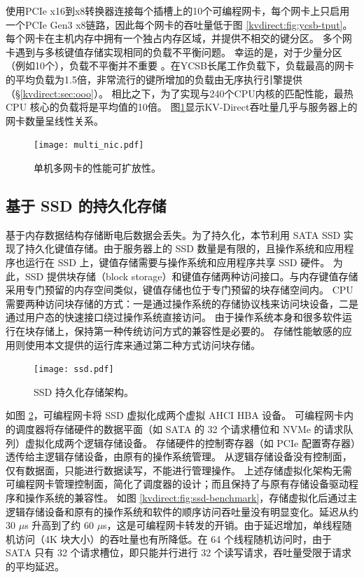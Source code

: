 使用PCIe x16到x8转换器连接每个插槽上的10个可编程网卡，每个网卡上只启用一个PCIe Gen3 x8链路，因此每个网卡的吞吐量低于图 \ref {kvdirect:fig:ycsb-tput}。
每个网卡在主机内存中拥有一个独占内存区域，并提供不相交的键分区。
多个网卡遇到与多核键值存储实现相同的负载不平衡问题。
幸运的是，对于少量分区（例如10个），负载不平衡并不重要 \cite {lim2014mica,li2016full}。在YCSB长尾工作负载下，负载最高的网卡的平均负载为1.5倍，非常流行的键所增加的负载由无序执行引擎提供（\S \ref {kvdirect:sec:ooo}）。
相比之下，为了实现与240个CPU内核的匹配性能，最热 CPU 核心的负载将是平均值的10倍。
图\ref {kvdirect:fig:multiple-nics}显示KV-Direct吞吐量几乎与服务器上的网卡数量呈线性关系。


\begin{figure}[htbp]
	\centering
	\texttt{[image: multi\_nic.pdf]}
	\caption{单机多网卡的性能可扩放性。}
	\label{kvdirect:fig:multiple-nics}
\end{figure}


\subsection{基于 SSD 的持久化存储}

基于内存数据结构存储断电后数据会丢失。为了持久化，本节利用 SATA SSD 实现了持久化键值存储。由于服务器上的 SSD 数量是有限的，且操作系统和应用程序也运行在 SSD 上，键值存储需要与操作系统和应用程序共享 SSD 硬件。
为此，SSD 提供块存储（block storage）和键值存储两种访问接口。与内存键值存储采用专门预留的内存空间类似，键值存储也位于专门预留的块存储空间内。
CPU 需要两种访问块存储的方式：一是通过操作系统的存储协议栈来访问块设备，二是通过用户态的快速接口绕过操作系统直接访问。
由于操作系统本身和很多软件运行在块存储上，保持第一种传统访问方式的兼容性是必要的。
存储性能敏感的应用则使用本文提供的运行库来通过第二种方式访问块存储。


\begin{figure}[htbp]
	\centering
	\texttt{[image: ssd.pdf]}
	\caption{SSD 持久化存储架构。}
	\label{kvdirect:fig:ssd}
\end{figure}

如图 \ref{kvdirect:fig:ssd}，可编程网卡将 SSD 虚拟化成两个虚拟 AHCI HBA 设备。
可编程网卡内的调度器将存储硬件的数据平面（如 SATA 的 32 个请求槽位和 NVMe 的请求队列）虚拟化成两个逻辑存储设备。
存储硬件的控制寄存器（如 PCIe 配置寄存器）透传给主逻辑存储设备，由原有的操作系统管理。
从逻辑存储设备没有控制面，仅有数据面，只能进行数据读写，不能进行管理操作。
上述存储虚拟化架构无需可编程网卡管理控制面，简化了调度器的设计；而且保持了与原有存储设备驱动程序和操作系统的兼容性。
如图 \ref{kvdirect:fig:ssd-benchmark}，存储虚拟化后通过主逻辑存储设备和原有的操作系统和软件的顺序访问吞吐量没有明显变化。延迟从约 30 $\mu$s 升高到了约 60 $\mu$s，这是可编程网卡转发的开销。由于延迟增加，单线程随机访问（4K 块大小）的吞吐量也有所降低。在 64 个线程随机访问时，由于 SATA 只有 32 个请求槽位，即只能并行进行 32 个读写请求，吞吐量受限于请求的平均延迟。

